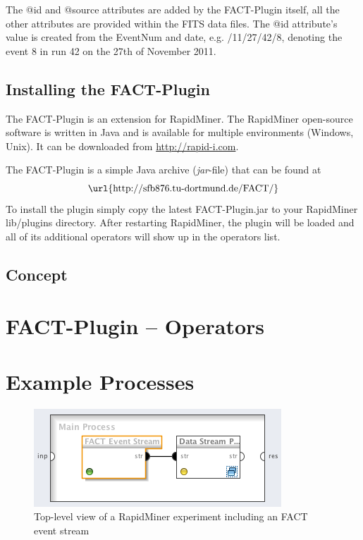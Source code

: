 The {\ttfamily @id} and {\ttfamily @source} attributes are added by
the FACT-Plugin itself, all the other attributes are provided within
the FITS data files. The {\ttfamily @id} attribute's value is created
from the {\ttfamily EventNum} and date, e.g. {/11/27/42/8}, denoting the event 8 in run 42 on the 27th of
November 2011.



\subsection*{Installing the FACT-Plugin}
The FACT-Plugin is an extension for RapidMiner. The RapidMiner
open-source software is written in Java and is available for multiple
environments (Windows, Unix). It can be downloaded from
\url{http://rapid-i.com}.

The FACT-Plugin is a simple Java archive ({\em jar}-file) that can be
found at
\begin{displaymath}
 \mbox{\url{http://sfb876.tu-dortmund.de/FACT/}}
\end{displaymath}
To install the plugin simply copy the latest {\ttfamily FACT-Plugin.jar}
to your RapidMiner {\ttfamily lib/plugins} directory. After restarting
RapidMiner, the plugin will be loaded and all of its additional operators
will show up in the operators list.




\subsection{Concept}



\section{\label{sec:operators}FACT-Plugin -- Operators}


\section{\label{sec:examples}Example Processes}

\begin{figure}[h!]
  \begin{center}
    \includegraphics[scale=0.6]{event-stream-process}
  \end{center}
\caption{\label{fig:event-stream-process}Top-level view of a RapidMiner experiment including an FACT event stream}
\end{figure}